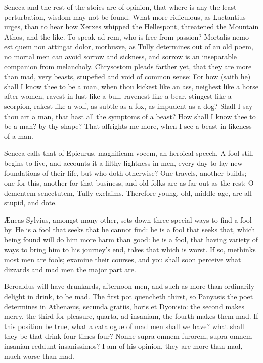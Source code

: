 {Seneca and the rest of the stoics are of opinion, that where is any the
least perturbation, wisdom may not be found. What more ridiculous, as
Lactantius urges, than to hear how Xerxes whipped the Hellespont,
threatened the Mountain Athos, and the like. To speak ad rem, who is
free from passion? Mortalis nemo est quem non attingat dolor,
morbusve, as Tully determines out of an old poem, no mortal men
can avoid sorrow and sickness, and sorrow is an inseparable companion
from melancholy. Chrysostom pleads farther yet, that they are more
than mad, very beasts, stupefied and void of common sense: For how
(saith he) shall I know thee to be a man, when thou kickest like an
ass, neighest like a horse after women, ravest in lust like a bull,
ravenest like a bear, stingest like a scorpion, rakest like a wolf, as
subtle as a fox, as impudent as a dog? Shall I say thou art a man, that
hast all the symptoms of a beast? How shall I know thee to be a man? by
thy shape? That affrights me more, when I see a beast in likeness of a
man.

Seneca calls that of Epicurus, magnificam vocem, an heroical
speech, A fool still begins to live, and accounts it a filthy lightness
in men, every day to lay new foundations of their life, but who doth
otherwise? One travels, another builds; one for this, another for that
business, and old folks are as far out as the rest; O dementem
senectutem, Tully exclaims. Therefore young, old, middle age, are all
stupid, and dote.

\AE{}neas Sylvius, amongst many other, sets down three special ways
to find a fool by. He is a fool that seeks that he cannot find: he is a
fool that seeks that, which being found will do him more harm than
good: he is a fool, that having variety of ways to bring him to his
journey's end, takes that which is worst. If so, methinks most men are
fools; examine their courses, and you shall soon perceive what dizzards
and mad men the major part are.

Beroaldus will have drunkards, afternoon men, and such as more than
ordinarily delight in drink, to be mad. The first pot quencheth thirst,
so Panyasis the poet determines in Athen\ae{}us, secunda gratiis, horis et
Dyonisio: the second makes merry, the third for pleasure, quarta, ad
insaniam, the fourth makes them mad. If this position be true, what a
catalogue of mad men shall we have? what shall they be that drink four
times four? Nonne supra omnem furorem, supra omnem insanian reddunt
insanissimos? I am of his opinion, they are more than mad, much worse
than mad.

}
